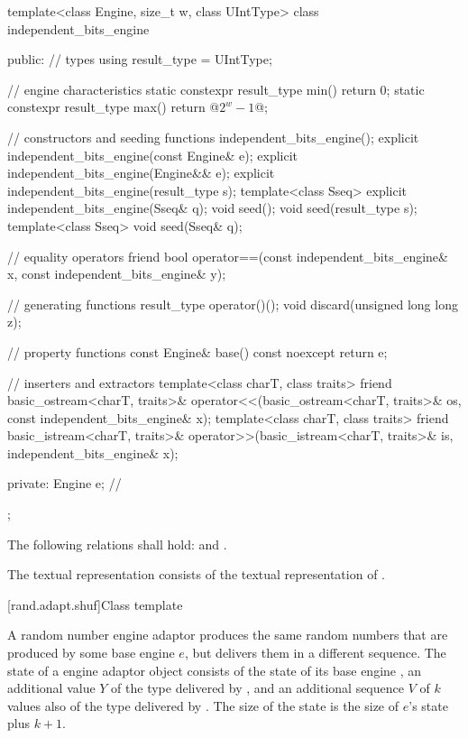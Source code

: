 %
%
\begin{codeblock}
template<class Engine, size_t w, class UIntType>
  class independent_bits_engine {
  public:
    // types
    using result_type = UIntType;

    // engine characteristics
    static constexpr result_type min() { return 0; }
    static constexpr result_type max() { return @$2^w - 1$@; }

    // constructors and seeding functions
    independent_bits_engine();
    explicit independent_bits_engine(const Engine& e);
    explicit independent_bits_engine(Engine&& e);
    explicit independent_bits_engine(result_type s);
    template<class Sseq> explicit independent_bits_engine(Sseq& q);
    void seed();
    void seed(result_type s);
    template<class Sseq> void seed(Sseq& q);

    // equality operators
    friend bool operator==(const independent_bits_engine& x, const independent_bits_engine& y);

    // generating functions
    result_type operator()();
    void discard(unsigned long long z);

    // property functions
    const Engine& base() const noexcept { return e; }

    // inserters and extractors
    template<class charT, class traits>
      friend basic_ostream<charT, traits>&
        operator<<(basic_ostream<charT, traits>& os, const independent_bits_engine& x);
    template<class charT, class traits>
      friend basic_istream<charT, traits>&
        operator>>(basic_istream<charT, traits>& is, independent_bits_engine& x);

  private:
    Engine e;   // \expos
  };
\end{codeblock}%

\pnum
The following relations shall hold:
and
  .

\pnum
The textual representation
consists of the textual representation of .



[rand.adapt.shuf]{Class template }%
%

\pnum
A  random number engine adaptor
produces the same random numbers
that are produced by some base engine $e$,
but delivers them in a different sequence.
The state 
of a  engine adaptor object 
consists of
 the state  of its base engine ,
 an additional value $Y$ of the type delivered by ,
and
 an additional sequence $V$ of $k$ values
 also of the type delivered by .
The size of the state is
 the size of $e$'s state plus $k + 1$.

